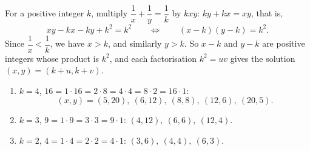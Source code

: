 For a positive integer $k$, multiply $\dfrac{1}{x}+\dfrac{1}{y}=\dfrac{1}{k}$ by $kxy$: $ky+kx=xy$, that is,
\[
xy-kx-ky+k^2=k^2\qquad\Longleftrightarrow\qquad (x-k)(y-k)=k^2 .
\]
Since $\dfrac{1}{x}<\dfrac{1}{k}$, we have $x>k$, and similarly $y>k$. So $x-k$ and $y-k$ are positive integers whose product is $k^2$, and each factorisation $k^2=uv$ gives the solution $(x,y)=(k+u,k+v)$.
\begin{enumerate}
\item[(a)] $k=4$, $16=1\cdot16=2\cdot8=4\cdot4=8\cdot2=16\cdot1$:
\[
(x,y)=\boxed{(5,20),\ (6,12),\ (8,8),\ (12,6),\ (20,5)} .
\]
\item[(b)] $k=3$, $9=1\cdot9=3\cdot3=9\cdot1$: $\boxed{(4,12),\ (6,6),\ (12,4)}$.
\item[(c)] $k=2$, $4=1\cdot4=2\cdot2=4\cdot1$: $\boxed{(3,6),\ (4,4),\ (6,3)}$.
\end{enumerate}
